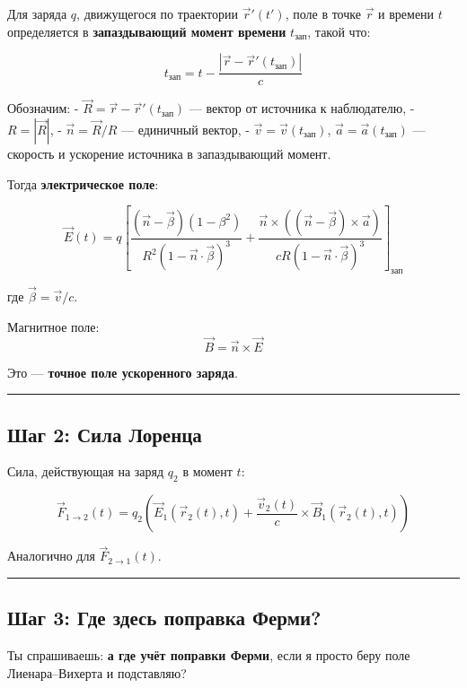 \documentclass[11pt]{article}
\begin{document}
Для заряда \(q\), движущегося по траектории \(\vec{r}'(t')\), поле в
точке \(\vec{r}\) и времени \(t\) определяется в \textbf{запаздывающий
момент времени} \(t_{\text{зап}}\), такой что:

\[
t_{\text{зап}} = t - \frac{|\vec{r} - \vec{r}'(t_{\text{зап}})|}{c}
\]

Обозначим: - \(\vec{R} = \vec{r} - \vec{r}'(t_{\text{зап}})\) --- вектор
от источника к наблюдателю, - \(R = |\vec{R}|\), -
\(\vec{n} = \vec{R}/R\) --- единичный вектор, -
\(\vec{v} = \vec{v}(t_{\text{зап}})\),
\(\vec{a} = \vec{a}(t_{\text{зап}})\) --- скорость и ускорение источника
в запаздывающий момент.

Тогда \textbf{электрическое поле}:

\[
\vec{E}(t) = q \left[ \frac{(\vec{n} - \vec{\beta}) (1 - \beta^2)}{R^2 (1 - \vec{n} \cdot \vec{\beta})^3} + \frac{\vec{n} \times \left( (\vec{n} - \vec{\beta}) \times \vec{a} \right)}{c R (1 - \vec{n} \cdot \vec{\beta})^3} \right]_{\text{зап}}
\]

где \(\vec{\beta} = \vec{v}/c\).

Магнитное поле: \[
\vec{B} = \vec{n} \times \vec{E}
\]

 Это --- \textbf{точное поле ускоренного заряда}.

\begin{center}\rule{0.5\linewidth}{\linethickness}\end{center}

\subsection{ Шаг 2: Сила Лоренца}

Сила, действующая на заряд \(q_2\) в момент \(t\):

\[
\vec{F}_{1 \to 2}(t) = q_2 \left( \vec{E}_1(\vec{r}_2(t), t) + \frac{\vec{v}_2(t)}{c} \times \vec{B}_1(\vec{r}_2(t), t) \right)
\]

Аналогично для \(\vec{F}_{2 \to 1}(t)\).

\begin{center}\rule{0.5\linewidth}{\linethickness}\end{center}

\subsection{ Шаг 3: Где здесь поправка Ферми?}

Ты спрашиваешь: \textbf{а где учёт поправки Ферми}, если я просто беру
поле Лиенара--Вихерта и подставляю?
\end{document}
